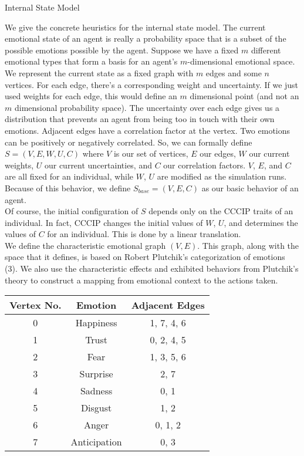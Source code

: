 \documentclass[11pt]{article}
\begin{document}
\begin{section}{Internal State Model}

We give the concrete heuristics for the internal state model. The current emotional state of an agent is really a probability space that is a subset of the possible emotions possible by the agent. Suppose we have a fixed $m$ different emotional types that form a basis for an agent's $m$-dimensional emotional space. We represent the current state as a fixed graph with $m$ edges and some $n$ vertices. For each edge, there's a corresponding weight and uncertainty. If we just used weights for each edge, this would define an $m$ dimensional point (and not an $m$ dimensional probability space). The uncertainty over each edge gives us a distribution that prevents an agent from being too in touch with their own emotions. Adjacent edges have a correlation factor at the vertex. Two emotions can be positively or negatively correlated. So, we can formally define $S = (V, E, W, U, C)$ where $V$ is our set of vertices, $E$ our edges, $W$ our current weights, $U$ our current uncertainties, and $C$ our correlation factors. $V$, $E$, and $C$ are all fixed for an individual, while $W$, $U$ are modified as the simulation runs. Because of this behavior, we define $S_{base} = (V, E, C)$ as our basic behavior of an agent.\\

Of course, the initial configuration of $S$ depends only on the CCCIP traits of an individual. In fact, CCCIP changes the initial values of $W$, $U$, and determines the values of $C$ for an individual. This is done by a linear translation. \\

We define the characteristic emotional graph $(V, E)$. This graph, along with the space that it defines, is based on Robert Plutchik's categorization of emotions (3). We also use the characteristic effects and exhibited behaviors from Plutchik's theory to construct a mapping from emotional context to the actions taken. \\

\begin{center}
\begin{tabular}{|c|c|c|}
\hline 
Vertex No. & Emotion & Adjacent Edges \\ 
\hline
0 & Happiness & 1, 7, 4, 6\\ 
\hline
1 & Trust & 0, 2, 4, 5\\
\hline
2 & Fear & 1, 3, 5, 6\\ 
\hline
3 & Surprise & 2, 7\\
\hline
4 & Sadness & 0, 1\\ 
\hline
5 & Disgust & 1, 2\\ 
\hline
6 & Anger & 0, 1, 2\\
\hline
7 & Anticipation & 0, 3\\ 
\hline
\end{tabular}
\end{center}


\end{section}
\end{document}
